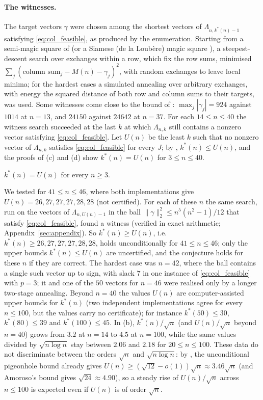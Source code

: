 \paragraph{The witnesses.}
The target vectors $\gamma$ were chosen among the shortest vectors of $\Lambda_{n,k^*(n)-1}$ satisfying \eqref{eq:col_feasible}, as produced by the enumeration.
Starting from a semi-magic square of  (or a Siamese (de la Loub\`ere) magic square \cite{andrews1960magic}), a steepest-descent search over exchanges within a row, which fix the row sums, minimised $\sum_j(\text{column sum}_j-M(n)-\gamma_j)^2$, with random exchanges to leave local minima; for the hardest cases a simulated annealing over arbitrary exchanges, with energy the squared distance of both row and column sums to their targets, was used.
Some witnesses come close to the bound of : $\max_j|\gamma_j|=924$ against $1014$ at $n=13$, and $24150$ against $24642$ at $n=37$.
For each $14\le n\le40$ the witness search succeeded at the last $k$ at which $\Lambda_{n,k}$ still contains a nonzero vector satisfying \eqref{eq:col_feasible}.
Let $U(n)$ be the least $k$ such that no nonzero vector of $\Lambda_{n,k}$ satisfies \eqref{eq:col_feasible} for every $J$; by , $k^*(n)\le U(n)$, and the proofs of (c) and (d) show $k^*(n)=U(n)$ for $3\le n\le40$.

\begin{conjecture}
\label{conj:lattice}
$k^*(n)=U(n)$ for every $n\ge3$.
\end{conjecture}

We tested  for $41\le n\le46$, where both implementations give $U(n)=26,27,27,27,28,28$ (not certified).
For each of these $n$ the same search, run on the vectors of $\Lambda_{n,U(n)-1}$ in the ball $\|\gamma\|_2^2\le n^5(n^2-1)/12$ that satisfy \eqref{eq:col_feasible}, found a witness (verified in exact arithmetic; Appendix~\ref{sec:appendix}).
So $k^*(n)\ge U(n)$, i.e.\ $k^*(n)\ge26,27,27,27,28,28$, holds unconditionally for $41\le n\le46$; only the upper bounds $k^*(n)\le U(n)$ are uncertified, and the conjecture holds for these $n$ if they are correct.
The hardest case was $n=42$, where the ball contains a single such vector up to sign, with slack $7$ in one instance of \eqref{eq:col_feasible} with $p=3$; it and one of the $50$ vectors for $n=46$ were realised only by a longer two-stage annealing.
Beyond $n=40$ the values $U(n)$ are computer-assisted upper bounds for $k^*(n)$ (two independent implementations agree for every $n\le100$, but the values carry no certificate); for instance $k^*(50)\le30$, $k^*(80)\le39$ and $k^*(100)\le45$.
In (b), $k^*(n)/\sqrt n$ (and $U(n)/\sqrt n$ beyond $n=40$) grows from $3.2$ at $n=14$ to $4.5$ at $n=100$, while the same values divided by $\sqrt{n\log n}$ stay between $2.06$ and $2.18$ for $20\le n\le100$.
These data do not discriminate between the orders $\sqrt n$ and $\sqrt{n\log n}$: by , the unconditional pigeonhole bound already gives $U(n)\ge(\sqrt{12}-o(1))\sqrt n\approx3.46\sqrt n$ (and Amoroso's bound gives $\sqrt{24}\approx4.90$), so a steady rise of $U(n)/\sqrt n$ across $n\le100$ is expected even if $U(n)$ is of order $\sqrt n$.
